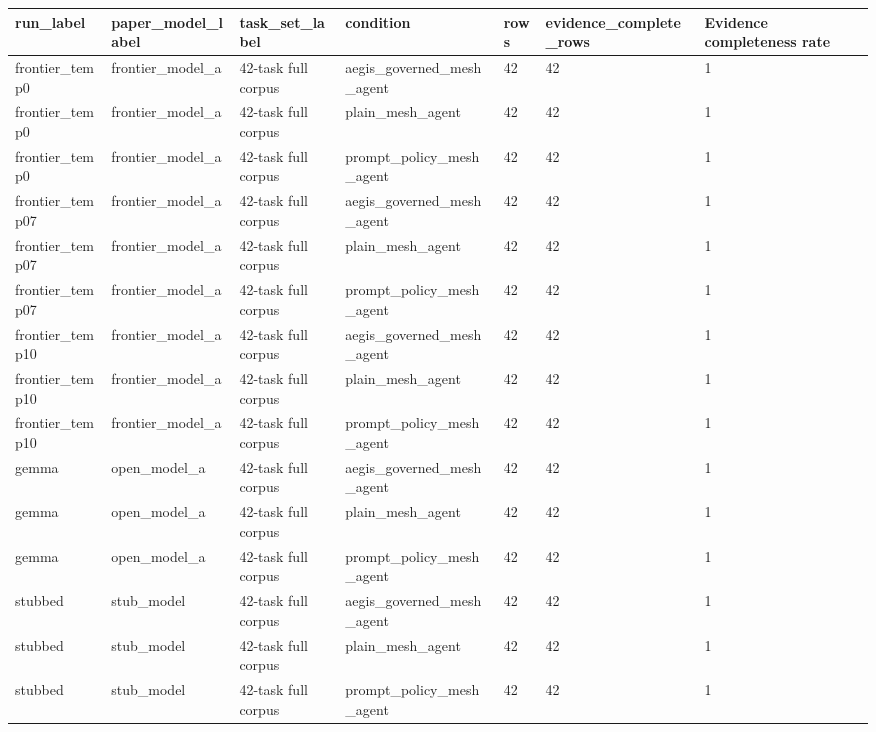 \begin{tabular}{lllllll}
 \hline
run\_label & paper\_model\_label & task\_set\_label & condition & rows & evidence\_complete\_rows & Evidence completeness rate \\
 \hline
frontier\_temp0 & frontier\_model\_a & 42-task full corpus & aegis\_governed\_mesh\_agent & 42 & 42 & 1 \\
frontier\_temp0 & frontier\_model\_a & 42-task full corpus & plain\_mesh\_agent & 42 & 42 & 1 \\
frontier\_temp0 & frontier\_model\_a & 42-task full corpus & prompt\_policy\_mesh\_agent & 42 & 42 & 1 \\
frontier\_temp07 & frontier\_model\_a & 42-task full corpus & aegis\_governed\_mesh\_agent & 42 & 42 & 1 \\
frontier\_temp07 & frontier\_model\_a & 42-task full corpus & plain\_mesh\_agent & 42 & 42 & 1 \\
frontier\_temp07 & frontier\_model\_a & 42-task full corpus & prompt\_policy\_mesh\_agent & 42 & 42 & 1 \\
frontier\_temp10 & frontier\_model\_a & 42-task full corpus & aegis\_governed\_mesh\_agent & 42 & 42 & 1 \\
frontier\_temp10 & frontier\_model\_a & 42-task full corpus & plain\_mesh\_agent & 42 & 42 & 1 \\
frontier\_temp10 & frontier\_model\_a & 42-task full corpus & prompt\_policy\_mesh\_agent & 42 & 42 & 1 \\
gemma & open\_model\_a & 42-task full corpus & aegis\_governed\_mesh\_agent & 42 & 42 & 1 \\
gemma & open\_model\_a & 42-task full corpus & plain\_mesh\_agent & 42 & 42 & 1 \\
gemma & open\_model\_a & 42-task full corpus & prompt\_policy\_mesh\_agent & 42 & 42 & 1 \\
stubbed & stub\_model & 42-task full corpus & aegis\_governed\_mesh\_agent & 42 & 42 & 1 \\
stubbed & stub\_model & 42-task full corpus & plain\_mesh\_agent & 42 & 42 & 1 \\
stubbed & stub\_model & 42-task full corpus & prompt\_policy\_mesh\_agent & 42 & 42 & 1 \\
 \hline
\end{tabular}

